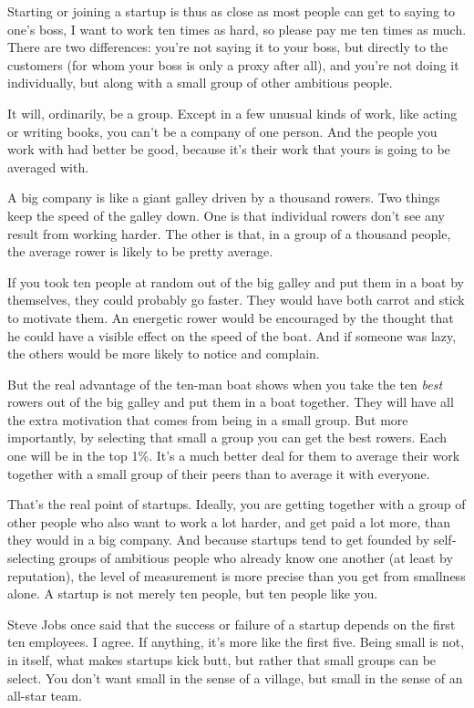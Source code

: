 \documentclass[12pt]{book}
\begin{document}
Starting or joining a startup is thus as close as most people can get to
saying to one's boss, I want to work ten times as hard, so please pay me
ten times as much. There are two differences: you're not saying it to
your boss, but directly to the customers (for whom your boss is only a
proxy after all), and you're not doing it individually, but along with a
small group of other ambitious people.

It will, ordinarily, be a group. Except in a few unusual kinds of work,
like acting or writing books, you can't be a company of one person. And
the people you work with had better be good, because it's their work
that yours is going to be averaged with.

A big company is like a giant galley driven by a thousand rowers. Two
things keep the speed of the galley down. One is that individual rowers
don't see any result from working harder. The other is that, in a group
of a thousand people, the average rower is likely to be pretty average.

If you took ten people at random out of the big galley and put them in a
boat by themselves, they could probably go faster. They would have both
carrot and stick to motivate them. An energetic rower would be
encouraged by the thought that he could have a visible effect on the
speed of the boat. And if someone was lazy, the others would be more
likely to notice and complain.

But the real advantage of the ten-man boat shows when you take the ten
\emph{best} rowers out of the big galley and put them in a boat
together. They will have all the extra motivation that comes from being
in a small group. But more importantly, by selecting that small a group
you can get the best rowers. Each one will be in the top 1\%. It's a
much better deal for them to average their work together with a small
group of their peers than to average it with everyone.

That's the real point of startups. Ideally, you are getting together
with a group of other people who also want to work a lot harder, and get
paid a lot more, than they would in a big company. And because startups
tend to get founded by self-selecting groups of ambitious people who
already know one another (at least by reputation), the level of
measurement is more precise than you get from smallness alone. A startup
is not merely ten people, but ten people like you.

Steve Jobs once said that the success or failure of a startup depends on
the first ten employees. I agree. If anything, it's more like the first
five. Being small is not, in itself, what makes startups kick butt, but
rather that small groups can be select. You don't want small in the
sense of a village, but small in the sense of an all-star team.
\end{document}
